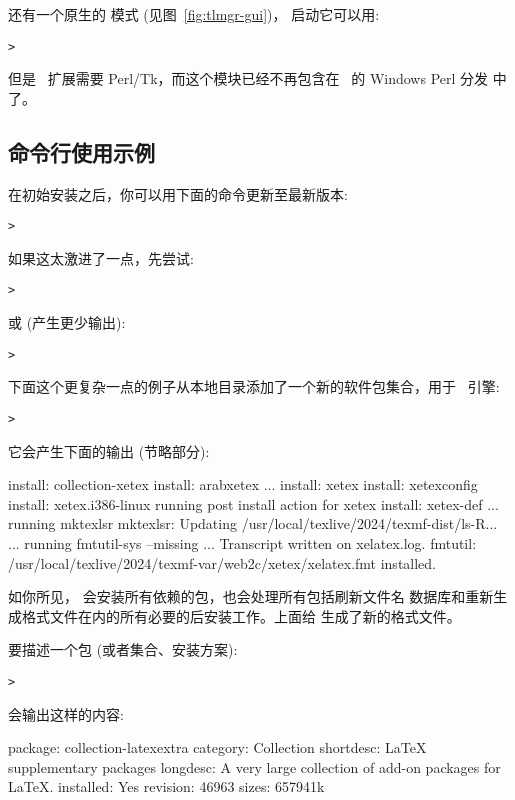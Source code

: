 \documentclass{article}
\begin{document}
 还有一个原生的 \GUI{} 模式 (见图~\ref{fig:tlmgr-gui})，
启动它可以用: 
\begin{alltt}
> 
\end{alltt}
但是 \GUI\ 扩展需要 Perl/Tk，而这个模块已经不再包含在 \TL\ 的 Windows Perl 分发
中了。

\subsection{ 命令行使用示例}

在初始安装之后，你可以用下面的命令更新至最新版本: 
\begin{alltt}
> 
\end{alltt}
如果这太激进了一点，先尝试: 
\begin{alltt}
> 
\end{alltt}
或 (产生更少输出): 
\begin{alltt}
> 
\end{alltt}

下面这个更复杂一点的例子从本地目录添加了一个新的软件包集合，用于 \XeTeX\ 引擎: 

\begin{alltt}
> 
\end{alltt}
它会产生下面的输出 (节略部分): 
\begin{fverbatim}
install: collection-xetex
install: arabxetex
...
install: xetex
install: xetexconfig
install: xetex.i386-linux
running post install action for xetex
install: xetex-def
...
running mktexlsr
mktexlsr: Updating /usr/local/texlive/2024/texmf-dist/ls-R...
...
running fmtutil-sys --missing
...
Transcript written on xelatex.log.
fmtutil: /usr/local/texlive/2024/texmf-var/web2c/xetex/xelatex.fmt installed.
\end{fverbatim}

如你所见， 会安装所有依赖的包，也会处理所有包括刷新文件名
数据库和重新生成格式文件在内的所有必要的后安装工作。上面给 \XeTeX{}
生成了新的格式文件。

要描述一个包 (或者集合、安装方案):
\begin{alltt}
> 
\end{alltt}
会输出这样的内容: 
\begin{fverbatim}
package:    collection-latexextra
category:   Collection
shortdesc:  LaTeX supplementary packages
longdesc:   A very large collection of add-on packages for LaTeX.
installed:  Yes
revision:   46963
sizes:      657941k
\end{fverbatim}
\end{document}
